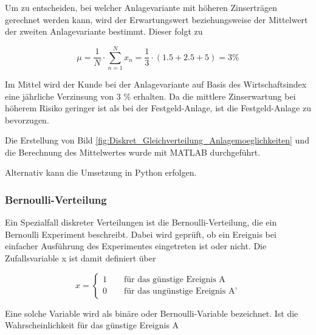 \noindent Um zu entscheiden, bei welcher Anlagevariante mit h\"{o}heren Zinsertr\"{a}gen gerechnet werden kann, wird der Erwartungswert beziehungsweise der Mittelwert der zweiten Anlagevariante bestimmt. Dieser folgt zu

\begin{equation}\label{eq:fourhundredtwenty}
\mu =\dfrac{1}{N} \cdot \sum _{n=1}^{N}x_{n} =\dfrac{1}{3} \cdot (1.5+2.5+5)=3 \%
\end{equation}

\noindent Im Mittel wird der Kunde bei der Anlagevariante auf Basis des Wirtschaftsindex eine j\"{a}hrliche Verzinsung von 3 \% erhalten. Da die mittlere Zinserwartung bei h\"{o}herem Risiko geringer ist als bei der Festgeld-Anlage, ist die Festgeld-Anlage zu bevorzugen. 

\clearpage 

\noindent Die Erstellung von Bild \ref{fig:Diskret_Gleichverteilung_Anlagemoeglichkeiten} und die Berechnung des Mittelwertes wurde mit MATLAB durchgef\"{u}hrt.



\noindent Alternativ kann die Umsetzung in Python erfolgen.



\clearpage 

\subsubsection{Bernoulli-Verteilung}

\noindent Ein Spezialfall diskreter Verteilungen ist die Bernoulli-Verteilung, die ein Bernoulli Experiment beschreibt. Dabei wird gepr\"{u}ft, ob ein Ereignis bei einfacher Ausf\"{u}hrung des Experimentes eingetreten ist oder nicht. Die Zufallsvariable x ist damit definiert \"{u}ber

\begin{equation}\label{eq:fourhundredtwentyone}
x=\left\{\begin{array}{l} {1 \qquad \text{für das günstige Ereignis A}} \\ 
{0\qquad \text{für das ungünstige Ereignis A'}} \end{array}\right.
\end{equation}

\noindent Eine solche Variable wird als bin\"{a}re oder Bernoulli-Variable bezeichnet. Ist die Wahrscheinlichkeit f\"{u}r das g\"{u}nstige Ereignis A

